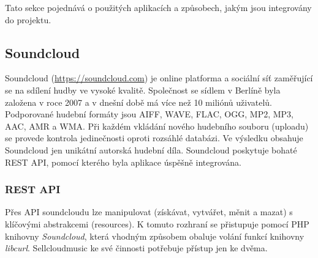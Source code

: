 \documentclass[12pt]{article}
\begin{document}
Tato sekce pojednává o použitých aplikacích a způsobech, jakým jsou integrovány do projektu.

\subsection{Soundcloud}

Soundcloud (\url{https://soundcloud.com}) je online platforma a sociální síť zaměřující se na sdílení hudby ve vysoké kvalitě. Společnost se sídlem v Berlíně byla založena v roce 2007 a v dnešní době má více než 10 miliónů uživatelů. Podporované hudební formáty jsou AIFF, WAVE, FLAC, OGG, MP2, MP3, AAC, AMR a WMA. Při každém vkládání nového hudebního souboru (uploadu) se provede kontrola jedinečnosti oproti rozsáhlé databázi. Ve výsledku obsahuje Soundcloud jen unikátní autorská hudební díla. Soundcloud poskytuje bohaté REST API, pomocí kterého byla aplikace úspěšně integrována.

\subsubsection{REST API}

Přes API soundcloudu lze manipulovat (získávat, vytvářet, měnit a mazat) s klíčovými abstrakcemi (resources). K tomuto rozhraní se přistupuje pomocí PHP knihovny \emph{Soundcloud}, která vhodným způsobem obaluje volání funkcí knihovny \emph{libcurl}. Sellcloudmusic ke své činnosti potřebuje přístup jen ke dvěma.
\end{document}
